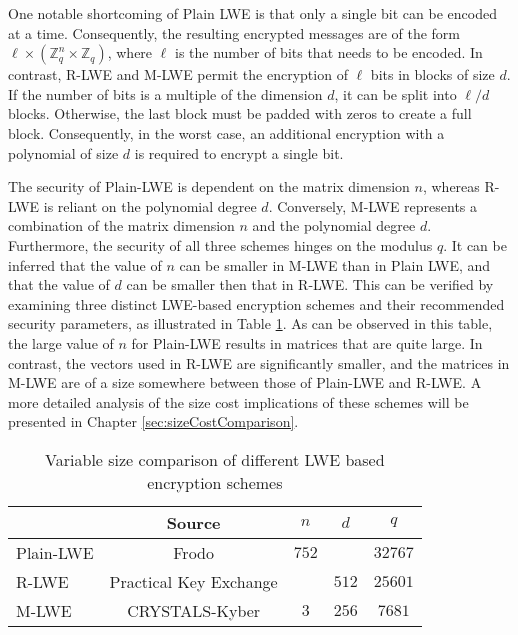 One notable shortcoming of Plain LWE is that only a single bit can be encoded at a time. Consequently, the resulting encrypted messages are of the form $\ell \times (\mathbb{Z}_q^{n}\times\mathbb{Z}_q)$, where $\ell$ is the number of bits that needs to be encoded. In contrast, R-LWE and M-LWE permit the encryption of $\ell$ bits in blocks of size $d$. If the number of bits is a multiple of the dimension $d$, it can be split into $\ell / d$ blocks. Otherwise, the last block must be padded with zeros to create a full block. Consequently, in the worst case, an additional encryption with a polynomial of size $d$ is required to encrypt a single bit.

The security of Plain-LWE is dependent on the matrix dimension $n$, whereas R-LWE is reliant on the polynomial degree $d$. Conversely, M-LWE represents a combination of the matrix dimension $n$ and the polynomial degree $d$.  
Furthermore, the security of all three schemes hinges on the modulus $q$. It can be inferred that the value of $n$ can be smaller in M-LWE than in Plain LWE, and that the value of $d$ can be smaller then that in R-LWE. This can be verified by examining three distinct LWE-based encryption schemes and their recommended security parameters, as illustrated in Table \ref{table:LweParameterComparison}. As can be observed in this table, the large value of $n$ for Plain-LWE results in matrices that are quite large. In contrast, the vectors used in R-LWE are significantly smaller, and the matrices in M-LWE are of a size somewhere between those of Plain-LWE and R-LWE. A more detailed analysis of the size cost implications of these schemes will be presented in Chapter \ref{sec:sizeCostComparison}.

\begin{table}[htp]
  \centering
  \caption{Variable size comparison of different LWE based encryption schemes}
  \begin{tabular}{|l|c|c|c|c|}
    \toprule
              & Source                                             & $n$   & $d$   & $q$     \\
    
    \midrule
    Plain-LWE & Frodo \cite{frodo}                                 & $752$ &       & $32767$ \\
    R-LWE     & Practical Key Exchange \cite{PracticalKeyExchange} &       & $512$ & $25601$ \\
    M-LWE     & CRYSTALS-Kyber \cite{CyrstalsKyber}                & $3$   & $256$ & $7681$  \\   
    \bottomrule
  \end{tabular}
  \label{table:LweParameterComparison}
\end{table}

